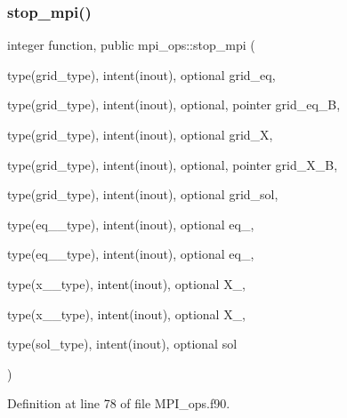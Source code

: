 \subsubsection{\texorpdfstring{stop\+\_\+mpi()}{stop\_mpi()}}
{\footnotesize\ttfamily integer function, public mpi\+\_\+ops\+::stop\+\_\+mpi (\begin{DoxyParamCaption}\item[{type(grid\+\_\+type), intent(inout), optional}]{grid\+\_\+eq,  }\item[{type(grid\+\_\+type), intent(inout), optional, pointer}]{grid\+\_\+eq\+\_\+B,  }\item[{type(grid\+\_\+type), intent(inout), optional}]{grid\+\_\+X,  }\item[{type(grid\+\_\+type), intent(inout), optional, pointer}]{grid\+\_\+\+X\+\_\+B,  }\item[{type(grid\+\_\+type), intent(inout), optional}]{grid\+\_\+sol,  }\item[{type(eq\+\_\+1\+\_\+type), intent(inout), optional}]{eq\+\_,  }\item[{type(eq\+\_\+2\+\_\+type), intent(inout), optional}]{eq\+\_,  }\item[{type(x\+\_\+1\+\_\+type), intent(inout), optional}]{X\+\_,  }\item[{type(x\+\_\+2\+\_\+type), intent(inout), optional}]{X\+\_,  }\item[{type(sol\+\_\+type), intent(inout), optional}]{sol }\end{DoxyParamCaption})}



Definition at line 78 of file M\+P\+I\+\_\+ops.\+f90.

